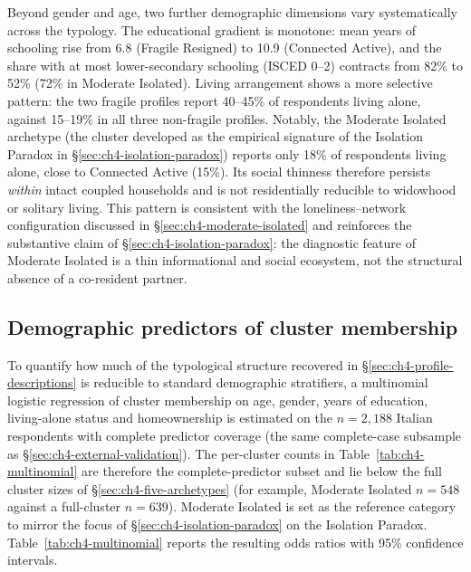 Beyond gender and age, two further demographic dimensions vary systematically across the typology. The educational gradient is monotone: mean years of schooling rise from 6.8 (Fragile Resigned) to 10.9 (Connected Active), and the share with at most lower-secondary schooling (ISCED 0--2) contracts from 82\% to 52\% (72\% in Moderate Isolated). Living arrangement shows a more selective pattern: the two fragile profiles report 40--45\% of respondents living alone, against 15--19\% in all three non-fragile profiles. Notably, the Moderate Isolated archetype (the cluster developed as the empirical signature of the Isolation Paradox in \S\ref{sec:ch4-isolation-paradox}) reports only 18\% of respondents living alone, close to Connected Active (15\%). Its social thinness therefore persists \emph{within} intact coupled households and is not residentially reducible to widowhood or solitary living. This pattern is consistent with the loneliness--network configuration discussed in \S\ref{sec:ch4-moderate-isolated} and reinforces the substantive claim of \S\ref{sec:ch4-isolation-paradox}: the diagnostic feature of Moderate Isolated is a thin informational and social ecosystem, not the structural absence of a co-resident partner.

\subsection{Demographic predictors of cluster membership}
\label{sec:ch4-multinomial}

To quantify how much of the typological structure recovered in \S\ref{sec:ch4-profile-descriptions} is reducible to standard demographic stratifiers, a multinomial logistic regression of cluster membership on age, gender, years of education, living-alone status and homeownership is estimated on the $n = 2{,}188$ Italian respondents with complete predictor coverage (the same complete-case subsample as \S\ref{sec:ch4-external-validation}). The per-cluster counts in Table~\ref{tab:ch4-multinomial} are therefore the complete-predictor subset and lie below the full cluster sizes of \S\ref{sec:ch4-five-archetypes} (for example, Moderate Isolated $n = 548$ against a full-cluster $n = 639$). Moderate Isolated is set as the reference category to mirror the focus of \S\ref{sec:ch4-isolation-paradox} on the Isolation Paradox. Table~\ref{tab:ch4-multinomial} reports the resulting odds ratios with 95\% confidence intervals.

